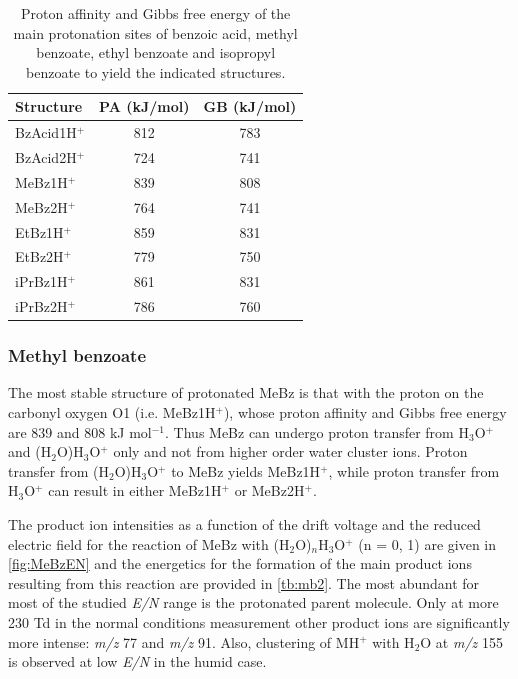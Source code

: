 \begin{table}[htbp]
\centering
\caption{Proton affinity and Gibbs free energy of the main protonation sites of benzoic acid, methyl benzoate, ethyl benzoate and isopropyl benzoate to yield the indicated structures.}
\label{tb:bz1}
\begin{tabular}{lcc}
\toprule
\textbf{Structure} &\textbf{PA (kJ/mol)} &\textbf{GB (kJ/mol)}\\ \toprule
BzAcid1H$^+$   &812 &783 \\
BzAcid2H$^+$   &724 &741 \\\midrule
MeBz1H$^+$ &	839	&808\\
MeBz2H$^+$ &	764	&741\\\midrule
EtBz1H$^+$ &	859	& 831\\
EtBz2H$^+$ &	779	& 750\\\midrule
iPrBz1H$^+$	&861	&831\\
iPrBz2H$^+$	&786	&760\\
\bottomrule
\end{tabular}
\end{table}
	
	

 
\subsubsection{Methyl benzoate}\label{section:MeBz}
The most stable structure of protonated MeBz  is that with the proton on the carbonyl oxygen O1 (i.e. MeBz1H$^+$), whose proton affinity and Gibbs free energy are  839 and 808 kJ mol$^{-1}$. Thus MeBz can undergo proton transfer from H$_3$O$^+$ and (H$_2$O)H$_3$O$^+$ only and not from higher order water cluster ions.
%
Proton transfer from (H$_2$O)H$_3$O$^+$ to MeBz yields MeBz1H$^+$, while proton transfer from H$_3$O$^+$ can result in either MeBz1H$^+$ or MeBz2H$^+$.

The product ion intensities as a function of the drift voltage and the reduced electric field for the reaction of MeBz with (H$_2$O)$_n$H$_3$O$^+$ (n = 0, 1) are given in \autoref{fig:MeBzEN} and the energetics for the formation of the main product ions resulting from this reaction are provided in \autoref{tb:mb2}. 
%
The most abundant for most of the studied \textit{E/N} range is the protonated parent molecule.
%
Only at more 230 Td in the normal conditions measurement other product ions are significantly more intense: \textit{m/z} 77 and \textit{m/z} 91. 
%
Also, clustering of MH$^+$ with H$_2$O at \textit{m/z} 155 is observed at low \textit{E/N} in the humid case.

